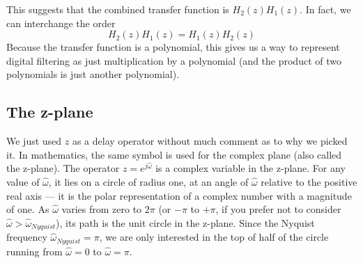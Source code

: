 This suggests that the combined transfer function is
$H_2(z)H_1(z)$. In fact, we can interchange the order
\begin{equation}
H_2(z)H_1(z) = H_1(z)H_2(z)
\end{equation}
Because the transfer function is a polynomial, this gives us a way to
represent digital filtering as just multiplication by a polynomial
(and the product of two polynomials is just another polynomial).


\subsection{The z-plane}

We just used $z$ as a delay operator without much comment as to why we
picked it. In mathematics, the same symbol is used for the complex plane (also called the z-plane).  The
operator $z=e^{j\hat{\omega}}$ is a complex variable in the
z-plane. For any value of $\hat{\omega}$, it lies on a circle of radius one,
at an angle of $\hat{\omega}$ relative to the positive real axis --- it is
the polar representation of a complex number with a magnitude of one. As $\hat{\omega}$ varies from
zero to $2\pi$ (or $-\pi$ to $+\pi$, if you prefer not to consider
$\hat{\omega} > \hat{\omega}_\mathit{Nyquist}$), its path is the unit circle in
the z-plane. Since the Nyquist frequency
$\hat{\omega}_\mathit{Nyquist}=\pi$, we are only interested in the top of half
of the circle running from $\hat{\omega}=0$ to $\hat{\omega}=\pi$.

